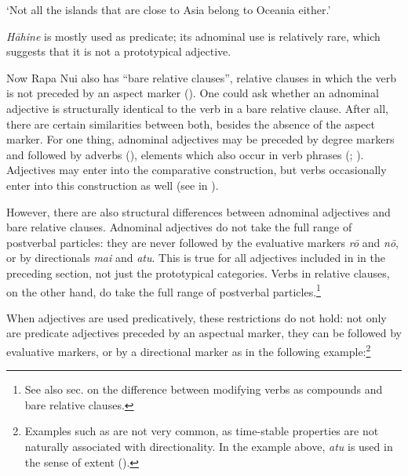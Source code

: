 \glt
‘Not all the islands that are close to Asia belong to Oceania either.’ \textstyleExampleref{[R342.008]} 
\z

\textit{Hāhine} is mostly used as predicate; its adnominal use is relatively rare, which suggests that it is not a prototypical adjective.

Now Rapa Nui also has “bare relative clauses”, relative clauses in which the verb is not preceded by an aspect marker (). One could ask whether an adnominal adjective is structurally identical to the verb in a bare relative clause. After all, there are certain similarities between both, besides the absence of the aspect marker. For one thing, adnominal adjectives may be preceded by degree markers and followed by adverbs (), elements which also occur in verb phrases (; ). Adjectives may enter into the comparative construction, but verbs occasionally enter into this construction as well (see  in ).

However, there are also structural differences between adnominal adjectives and bare relative clauses. Adnominal adjectives do not take the full range of postverbal particles: they are never followed by the evaluative markers \textit{rō} and \textit{nō}, or by directionals \textit{mai} and \textit{atu}. This is true for all adjectives included in  in the preceding section, not just the prototypical categories. Verbs in relative clauses, on the other hand, do take the full range of postverbal particles.\footnote{\label{fn:134}See also sec.  on the difference between modifying verbs as compounds and bare relative clauses.}

When adjectives are used predicatively, these restrictions do not hold: not only are predicate adjectives preceded by an aspectual marker, they can be followed by evaluative markers, or by a directional marker as in the following example:\footnote{\label{fn:135}Examples such as  are not very common, as time-stable properties are not naturally associated with directionality. In the example above, \textit{atu} is used in the sense of extent ().}

